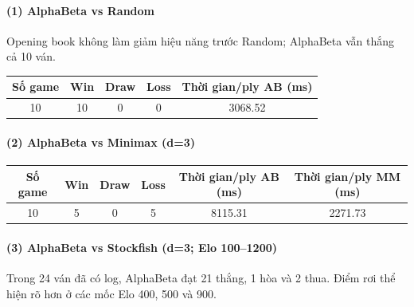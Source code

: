 \paragraph*{(1) AlphaBeta vs Random}
Opening book không làm giảm hiệu năng trước Random; AlphaBeta vẫn thắng cả 10 ván.

\begin{center}
\begin{tabular}{|c|c|c|c|c|}
\hline
\textbf{Số game} & \textbf{Win} & \textbf{Draw} & \textbf{Loss} & \textbf{Thời gian/ply AB (ms)} \\
\hline
10 & 10 & 0 & 0 & 3068.52 \\
\hline
\end{tabular}
\end{center}

\paragraph*{(2) AlphaBeta vs Minimax (d=3)}

\begin{center}
\begin{tabular}{|c|c|c|c|c|c|}
\hline
\textbf{Số game} & \textbf{Win} & \textbf{Draw} & \textbf{Loss} & \textbf{Thời gian/ply AB (ms)} & \textbf{Thời gian/ply MM (ms)} \\
\hline
10 & 5 & 0 & 5 & 8115.31 & 2271.73 \\
\hline
\end{tabular}
\end{center}

\paragraph*{(3) AlphaBeta vs Stockfish (d=3; Elo 100--1200)}
Trong 24 ván đã có log, AlphaBeta đạt 21 thắng, 1 hòa và 2 thua. Điểm rơi thể hiện rõ hơn ở các mốc Elo 400, 500 và 900.

